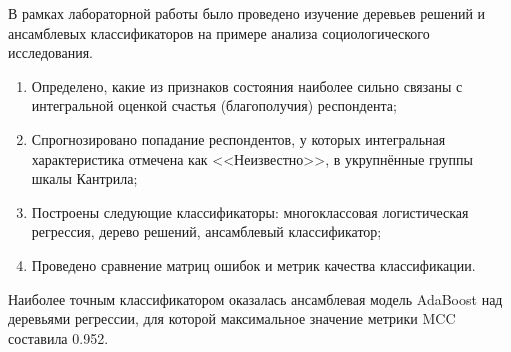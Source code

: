 
В рамках лабораторной работы было проведено изучение деревьев решений и ансамблевых классификаторов на примере анализа социологического исследования.

\begin{enumerate}[label*=\arabic*.]
	\item Определено, какие из признаков состояния наиболее сильно связаны с интегральной оценкой счастья (благополучия) респондента;
	\item Спрогнозировано попадание респондентов, у которых интегральная характеристика отмечена как <<Неизвестно>>, в укрупнённые группы шкалы Кантрила;
	\item Построены следующие классификаторы: многоклассовая логистическая регрессия, дерево решений, ансамблевый классификатор;
	\item Проведено сравнение матриц ошибок и метрик качества классификации.
\end{enumerate}

Наиболее точным классификатором оказалась ансамблевая модель AdaBoost над деревьями регрессии, для которой максимальное значение метрики MCC составила 0.952.
